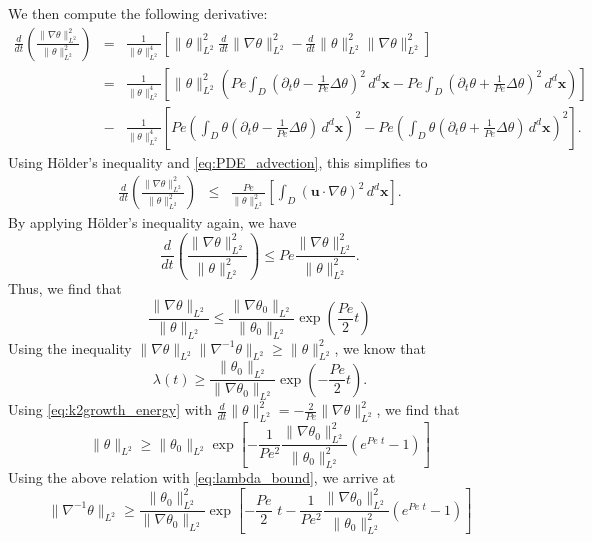 \documentclass{jfm}
\newcommand{\ddt}[1]{\frac{d #1}{dt}}
\newcommand{\hmone}[1]{\|\nabla^{-1} #1\|_{L^{2}}}
\newcommand{\ltwo}[1]{\|#1\|_{L^{2}}}
\newcommand{\hone}[1]{\| \nabla #1\|_{L^{2}}}
\newcommand{\sint}[1]{\int_{D} #1 \, d^{d}\mathbf{x}}
\renewcommand{\vec}[1]{\mathbf{#1}}
\newcommand{\ppt}[1]{\partial_{t} #1}
\newcommand{\lap}{\Delta }
\newcommand{\pbrac}[1]{\left( #1 \right)}
\newcommand{\sbrac}[1]{\left[ #1 \right]}
\begin{document}
We then compute the following derivative:
%
\begin{eqnarray*}
	\ddt{} \pbrac{ \frac{\hone{\theta}^2}{\ltwo{\theta}^2} } 
			&=& \frac{1}{\ltwo{\theta}^4}
			\sbrac{
				\ltwo{\theta}^2\ddt{}\hone{\theta}^2
				-\ddt{}\ltwo{\theta}^2\hone{\theta}^2			
			}\\
			&=& \frac{1}{\ltwo{\theta}^4}
			\sbrac{
				\ltwo{\theta}^2
				\pbrac{
					Pe \sint{\left(\ppt{\theta}
	 									-\frac{1}{Pe}\lap \theta\right)^2} 
 					-Pe\sint{\left(\ppt{\theta}
	 									+\frac{1}{Pe}\lap \theta\right)^2} 
				}
			}\\
		&-&\frac{1}{\ltwo{\theta}^4}
			\sbrac{
				Pe
				\pbrac{
					 \sint{\theta\left(\ppt{\theta}
	 									-\frac{1}{Pe}\lap \theta\right)} 
 				}^2		
 				-
 				Pe
 				\pbrac{
					 \sint{\theta\left(\ppt{\theta}
	 									+\frac{1}{Pe}\lap \theta\right)} 
 				}^2					
			}.
\end{eqnarray*}
%
Using H\"older's inequality and \eqref{eq:PDE_advection}, this simplifies to
%
\begin{eqnarray*}
	\ddt{} \pbrac{ \frac{\hone{\theta}^2}{\ltwo{\theta}^2} } 
			&\leq & \frac{Pe}{\ltwo{\theta}^2}
			\sbrac{
					 \sint{(\vec{u}\cdot \nabla \theta)^2} 
			}.
\end{eqnarray*}
By applying H\"older's inequality again, we have
\begin{equation}
\label{eq:k2growth_energy}
	\ddt{} 
		\pbrac{ 
			\frac{\hone{\theta}^2}{\ltwo{\theta}^2} 
		} 
		\leq  
		Pe
		\frac{\hone{\theta}^2}{\ltwo{\theta}^2} .
\end{equation}
%
Thus, we find that 
%
\begin{equation}
		\frac{\hone{\theta}}{\ltwo{\theta}} 
		\leq  
		\frac{\hone{\theta_0}}{\ltwo{\theta_0}}
		\exp{\pbrac{\frac{Pe}{2} t}}
\end{equation}
%
Using the inequality $\hone{\theta}\hmone{\theta}\geq \ltwo{\theta}^2$, we know that 
%
\begin{equation}
\label{eq:lambda_bound}
\lambda(t) \geq \frac{\ltwo{\theta_0}}{\hone{\theta_0}}\exp{\pbrac{-\frac{Pe}{2}t}}.
\end{equation}
%
Using \eqref{eq:k2growth_energy} with  $\ddt{}\ltwo{\theta}^2 = -\frac{2}{Pe} \hone{\theta}^2$, 
we find that
%
\begin{equation}
\ltwo{\theta}\geq \ltwo{\theta_{0}}\exp\left[-\frac{1}{Pe^2}\frac{\hone{\theta_0}^2}{\ltwo{\theta_0}^2}\left(e^{Pe \, \, t}-1\right)\right]
\end{equation}
%
Using the above relation with  \eqref{eq:lambda_bound}, we arrive at
%
\begin{equation}
\hmone{\theta}\geq \frac{\ltwo{\theta_{0}}^2}{\hone{\theta_0}}\exp\left[-\frac{Pe}{2} \,\, t-\frac{1}{Pe^2}\frac{\hone{\theta_0}^2}{\ltwo{\theta_0}^2}\left(e^{Pe \,\, t}-1\right)\right]
\end{equation}
\end{document}
